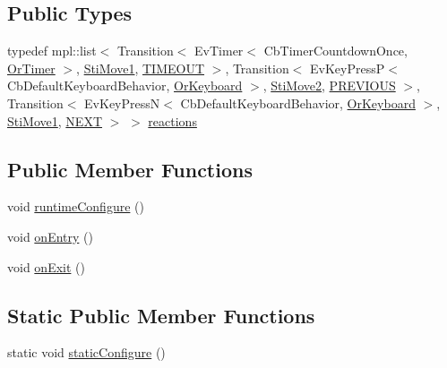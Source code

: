 \subsection*{Public Types}
\begin{DoxyCompactItemize}
\item 
typedef mpl\+::list$<$ Transition$<$ Ev\+Timer$<$ Cb\+Timer\+Countdown\+Once, \hyperlink{classsm__starcraft__ai_1_1OrTimer}{Or\+Timer} $>$, \hyperlink{structsm__starcraft__ai_1_1move__inner__states_1_1StiMove1}{Sti\+Move1}, \hyperlink{structsm__starcraft__ai_1_1move__inner__states_1_1StiMove3_1_1TIMEOUT}{T\+I\+M\+E\+O\+UT} $>$, Transition$<$ Ev\+Key\+PressP$<$ Cb\+Default\+Keyboard\+Behavior, \hyperlink{classsm__starcraft__ai_1_1OrKeyboard}{Or\+Keyboard} $>$, \hyperlink{structsm__starcraft__ai_1_1move__inner__states_1_1StiMove2}{Sti\+Move2}, \hyperlink{structsm__starcraft__ai_1_1move__inner__states_1_1StiMove3_1_1PREVIOUS}{P\+R\+E\+V\+I\+O\+US} $>$, Transition$<$ Ev\+Key\+PressN$<$ Cb\+Default\+Keyboard\+Behavior, \hyperlink{classsm__starcraft__ai_1_1OrKeyboard}{Or\+Keyboard} $>$, \hyperlink{structsm__starcraft__ai_1_1move__inner__states_1_1StiMove1}{Sti\+Move1}, \hyperlink{structsm__starcraft__ai_1_1move__inner__states_1_1StiMove3_1_1NEXT}{N\+E\+XT} $>$ $>$ \hyperlink{structsm__starcraft__ai_1_1move__inner__states_1_1StiMove3_a80a8cb4c25b8e2a44e50da48373cb72c}{reactions}
\end{DoxyCompactItemize}
\subsection*{Public Member Functions}
\begin{DoxyCompactItemize}
\item 
void \hyperlink{structsm__starcraft__ai_1_1move__inner__states_1_1StiMove3_ad32f89ed6e3b623f544aa84760247a21}{runtime\+Configure} ()
\item 
void \hyperlink{structsm__starcraft__ai_1_1move__inner__states_1_1StiMove3_a21bcffa9d10d3fbfc855a53664e2e833}{on\+Entry} ()
\item 
void \hyperlink{structsm__starcraft__ai_1_1move__inner__states_1_1StiMove3_a87ce076677f2a413212e302852780fa8}{on\+Exit} ()
\end{DoxyCompactItemize}
\subsection*{Static Public Member Functions}
\begin{DoxyCompactItemize}
\item 
static void \hyperlink{structsm__starcraft__ai_1_1move__inner__states_1_1StiMove3_a40a677f56bfc7db23de87d05ef8f39bf}{static\+Configure} ()
\end{DoxyCompactItemize}
